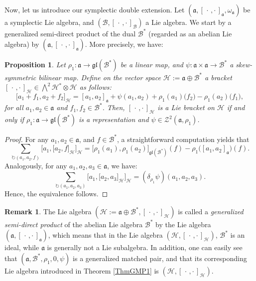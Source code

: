 \documentclass[final,1p,times,nopreprintline]{elsarticle}
\newtheorem{proposition}{Proposition}[section]
\theoremstyle{definition}
\newtheorem{remark}{Remark}[section]
\numberwithin{equation}{section}
\newcommand{\w}{\omega}
\newcommand{\ai}{\mathfrak{a}}
\newcommand{\h}{\mathcal{H}}
\numberwithin{equation}{section}
\newcommand{\gl}{\mathfrak{gl}}
\newcommand{\cro}{[\,\cdot\,,\cdot\,]}
\newcommand{\bi}{\mathcal{B}}
\begin{document}
Now, let us introduce our symplectic double extension. Let $(\ai,\cro_\ai,\w_\ai)$ be a symplectic Lie algebra, and $(\bi,\cro_\bi)$ a Lie algebra. We start by a generalized semi-direct product of the dual $\bi^*$ (regarded as an abelian Lie algebra) by $(\ai,\cro_\ai)$. More precisely, we have:

\begin{proposition}\label{PropoGeneSemDirProd}
Let $\rho_1:\ai\to\gl(\bi^*)$ be a linear map, and $\psi:\ai\times\ai\to\bi^*$ a skew-symmetric bilinear map. Define on the vector space $\h:=\ai\oplus\bi^*$ a bracket $\cro_\h\in\bigwedge^2\h^*\otimes\h$ as follows:
\begin{equation}\label{LieBrackPropoGeneSemDirProd}
\Big[a_1+f_1,a_2+f_2\Big]_\h=[a_1,a_2]_\ai+\psi(a_1,a_2)+\rho_1(a_1)\big(f_2\big)-\rho_1(a_2)\big(f_1\big),
\end{equation}
for all $a_1,a_2\in\ai$ and $f_1,f_2\in\bi^*$. Then, $\cro_\h$ is a Lie bracket on $\h$ if and only if $\rho_1:\ai\to\gl(\bi^*)$ is a representation and $\psi\in\mathcal{Z}^2(\ai,\rho_1)$.
\end{proposition}

\begin{proof}
For any $a_1,a_2\in\ai$, and $f\in\bi^*$, a straightforward computation yields that
\begin{equation*}
\displaystyle\sum_{\circlearrowright (a_1,a_2,f)}\Big[a_1,\big[a_2,f\big]_\h\Big]_\h=\Big[\rho_1(a_1),\rho_1(a_2)\Big]_{\gl(\bi^*)}(f)-\rho_1\big([a_1,a_2]_\ai\big)(f).
\end{equation*}
Analogously, for any $a_1,a_2,a_3\in\ai$, we have:
\begin{equation*}
\displaystyle\sum_{\circlearrowright (a_1,a_2,a_3)}\Big[a_1,\big[a_2,a_3\big]_\h\Big]_\h=\left(\delta_{\rho_1}\psi\right)(a_1,a_2,a_3).
\end{equation*}
Hence, the equivalence follows.
\end{proof}

\begin{remark}\label{Rmq1GenSemiDirProd}
The Lie algebra $(\h:=\ai\oplus\bi^*,\cro_\h)$ is called a \textit{generalized semi-direct product} of the abelian Lie algebra $\bi^*$ by the Lie algebra $(\ai,\cro_\ai)$, which means that in the Lie algebra $(\h,\cro_\h)$, $\bi^*$ is an ideal, while $\ai$ is generally not a Lie subalgebra. In addition, one can easily see that $(\ai,\bi^*,\rho_1,0,\psi)$ is a generalized matched pair, and that its corresponding Lie algebra introduced in Theorem \ref{ThmGMP1} is $(\h,\cro_\h)$.
\end{remark}
\end{document}

